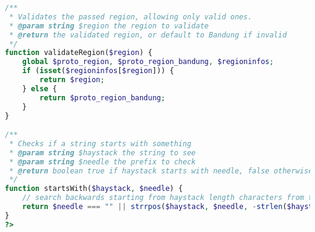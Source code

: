 \begin{lstlisting}[language=PHP,basicstyle=\tiny,caption=utils.php,label={lst:utils.php}]
/**
 * Validates the passed region, allowing only valid ones.
 * @param string $region the region to validate
 * @return the validated region, or default to Bandung if invalid
 */
function validateRegion($region) {
	global $proto_region, $proto_region_bandung, $regioninfos;
	if (isset($regioninfos[$region])) {
		return $region;
	} else {
		return $proto_region_bandung;
	}
}

/**
 * Checks if a string starts with something
 * @param string $haystack the string to see
 * @param string $needle the prefix to check
 * @return boolean true if haystack starts with needle, false otherwise.
 */
function startsWith($haystack, $needle) {
	// search backwards starting from haystack length characters from the end
	return $needle === "" || strrpos($haystack, $needle, -strlen($haystack)) !== FALSE;
}
?>
\end{lstlisting}

